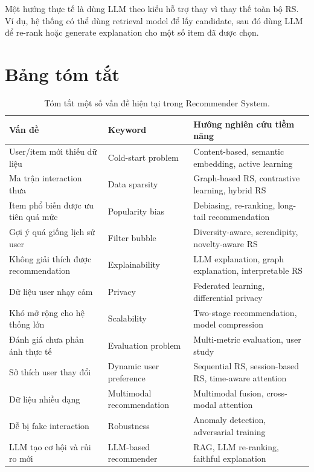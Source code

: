 \documentclass[12pt,a4paper]{article}
\begin{document}
Một hướng thực tế là dùng LLM theo kiểu hỗ trợ thay vì thay thế toàn bộ RS. 
Ví dụ, hệ thống có thể dùng retrieval model để lấy candidate, sau đó dùng LLM để re-rank hoặc generate explanation cho một số item đã được chọn.

\section{Bảng tóm tắt}

\begin{table}[h!]
\centering
\small
\begin{tabular}{p{4cm} p{3.5cm} p{6cm}}
\toprule
\textbf{Vấn đề} & \textbf{Keyword} & \textbf{Hướng nghiên cứu tiềm năng} \\
\midrule
User/item mới thiếu dữ liệu & Cold-start problem & Content-based, semantic embedding, active learning \\
Ma trận interaction thưa & Data sparsity & Graph-based RS, contrastive learning, hybrid RS \\
Item phổ biến được ưu tiên quá mức & Popularity bias & Debiasing, re-ranking, long-tail recommendation \\
Gợi ý quá giống lịch sử user & Filter bubble & Diversity-aware, serendipity, novelty-aware RS \\
Không giải thích được recommendation & Explainability & LLM explanation, graph explanation, interpretable RS \\
Dữ liệu user nhạy cảm & Privacy & Federated learning, differential privacy \\
Khó mở rộng cho hệ thống lớn & Scalability & Two-stage recommendation, model compression \\
Đánh giá chưa phản ánh thực tế & Evaluation problem & Multi-metric evaluation, user study \\
Sở thích user thay đổi & Dynamic user preference & Sequential RS, session-based RS, time-aware attention \\
Dữ liệu nhiều dạng & Multimodal recommendation & Multimodal fusion, cross-modal attention \\
Dễ bị fake interaction & Robustness & Anomaly detection, adversarial training \\
LLM tạo cơ hội và rủi ro mới & LLM-based recommender & RAG, LLM re-ranking, faithful explanation \\
\bottomrule
\end{tabular}
\caption{Tóm tắt một số vấn đề hiện tại trong Recommender System.}
\label{tab:rs_problems}
\end{table}
\end{document}
